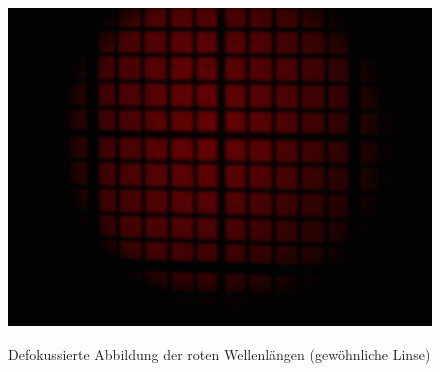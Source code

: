 \begin{figure}[htb]
	\hfill
	\begin{minipage}[t]{0.32\textwidth}
		\includegraphics[clip=true, trim=700px 950px 900px 250px, width=\linewidth]{img/ChromAbb/Prakt_Linsenfehler_2015_06_04_070}
		\label{fig:cm_rot}
		\caption{Defokussierte Abbildung der roten Wellenlängen (gewöhnliche Linse)}
	\end{minipage}
		
	\vspace{0.5cm}
	

\end{figure}
